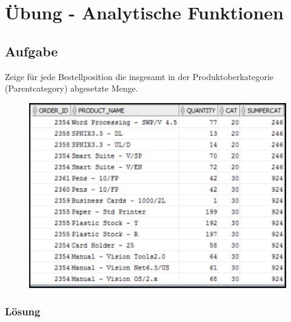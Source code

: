 \section{Übung - Analytische Funktionen}
\label{sec:uebung_07}

\label{subsec:uebung_07.aufgabe_01}
\subsection{Aufgabe}
Zeige für jede Bestellposition die insgesamt in der Produktoberkategorie (Parentcategory) abgesetzte Menge.

\begin{figure}[H]
  \centering
  \includegraphics[width=1\textwidth]{img//uebung_07_-_aufgabe_01.png}
  \label{img:uebung_07_-_aufgabe_01}
\end{figure}

\subsubsection*{Lösung}
\label{subsubsec:uebung_07.aufgabe_01.loesung}


\label{subsec:uebung_07.aufgabe_02}
